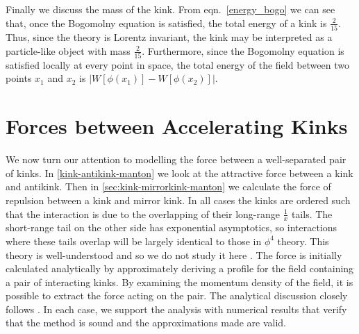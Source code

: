 \documentclass[11pt, oneside]{article}  	%
\numberwithin{equation}{section}
\begin{document}
Finally we discuss the mass of the kink. From eqn.~\ref{energy_bogo} we can see that, once the Bogomolny equation is satisfied, the total energy of a kink is $\frac{2}{15}$. Thus, since the theory is Lorentz invariant, the kink may be interpreted as a particle-like object with mass $\frac{2}{15}$. Furthermore, since the Bogomolny equation is satisfied locally at every point in space, the total energy of the field between two points $x_1$ and $x_2$ is $\left | W\left [ \phi(x_1)\right ] - W\left [ \phi(x_2)\right ]\right |$.

\section{Forces between Accelerating Kinks}
We now turn our attention to modelling the force between a well-separated pair of kinks. In \textsection \ref{kink-antikink-manton} we look at the attractive force between a kink and antikink. Then in \textsection \ref{sec:kink-mirrorkink-manton} we calculate the force of repulsion between a kink and mirror kink. In all cases the kinks are ordered such that the interaction is due to the overlapping of their long-range $\frac{1}{x}$ tails. The short-range tail on the other side has exponential asymptotics, so interactions where these tails overlap will be largely identical to those in $\phi^4$ theory. This theory is well-understood and so we do not study it here \cite{manton_topological_2004}. The force is initially calculated analytically by approximately deriving a profile for the field containing a pair of interacting kinks. By examining the momentum density of the field, it is possible to extract the force acting on the pair. The analytical discussion closely follows \cite{manton_forces_2019}. In each case, we support the analysis with numerical results that verify that the method is sound and the approximations made are valid.\par
\end{document}
